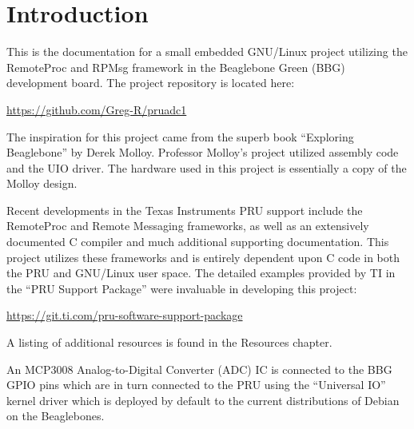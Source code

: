 %
%
%

\chapter{Introduction}

This is the documentation for a small embedded GNU/Linux project utilizing the RemoteProc and RPMsg framework in the Beaglebone Green (BBG) development board.  The project repository is located here:

\url{https://github.com/Greg-R/pruadc1}

The inspiration for this project came from the superb book ``Exploring Beaglebone'' by Derek Molloy.  Professor Molloy's project utilized assembly code and the UIO driver.  The hardware used in this project is essentially a copy of the Molloy design.

Recent developments in the Texas Instruments PRU support include the RemoteProc and Remote Messaging frameworks, as well as an extensively documented C compiler and much additional supporting documentation.  This project utilizes these frameworks and is entirely dependent upon C code in both the PRU and GNU/Linux user space.  The detailed examples provided by TI in the ``PRU Support Package'' were invaluable in developing this project:

\url{https://git.ti.com/pru-software-support-package}

A listing of additional resources is found in the Resources chapter.

An MCP3008 Analog-to-Digital Converter (ADC) IC is connected to the BBG GPIO pins which are in turn connected to the PRU using the ``Universal IO'' kernel driver which is deployed by default to the current distributions of Debian on the Beaglebones.

